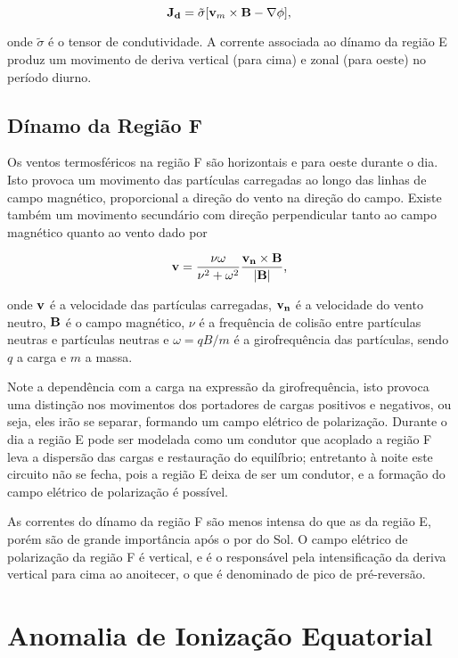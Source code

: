 \begin{equation}
{\bf J_d}=\tilde{\sigma}[{\bf v}_m\times{\bf B}-{\bf \nabla}\phi]\mbox{,}~
\end{equation}

onde $\tilde{\sigma}$ é o tensor de condutividade. A corrente associada ao dínamo da região E produz um movimento de deriva vertical (para cima) e zonal (para oeste) no período diurno.

\subsection{Dínamo da Região F}

Os ventos termosféricos na região F são horizontais e para oeste durante o dia. Isto provoca um movimento das partículas carregadas ao longo das linhas de campo magnético, proporcional a direção do vento na direção do campo. Existe também um movimento secundário com direção perpendicular tanto ao campo magnético quanto ao vento \cite{BATISTA:1986} dado por

\begin{equation}
{\bf v}=\frac{\nu\omega}{\nu^2+\omega^2}\frac{{\bf v_n}\times{\bf B}}{|{\bf B}|}\mbox{,}~
\end{equation}

onde ${\bf v}$ é a velocidade das partículas carregadas, ${\bf v_n}$ é a velocidade do vento neutro, ${\bf B}$ é o campo magnético, $\nu$ é a frequência de colisão entre partículas neutras e partículas neutras e $\omega={qB/m}$ é a girofrequência das partículas, sendo $q$ a carga e $m$ a massa.

Note a dependência com a carga na expressão da girofrequência, isto provoca uma distinção nos movimentos dos portadores de cargas positivos e negativos, ou seja, eles irão se separar, formando um campo elétrico de polarização. Durante o dia a região E pode ser modelada como um condutor que acoplado a região F leva a dispersão das cargas e restauração do equilíbrio; entretanto à noite este circuito não se fecha, pois a região E deixa de ser um condutor, e a formação do campo elétrico de polarização é possível.

As correntes do dínamo da região F são menos intensa do que as da região E, porém são de grande importância após o por do Sol. O campo elétrico de polarização da região F é vertical, e é o responsável pela intensificação da deriva vertical para cima ao anoitecer, o que é denominado de pico de pré-reversão.

\section{Anomalia de Ionização Equatorial}


